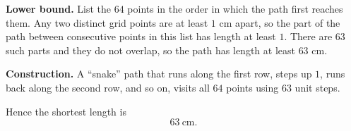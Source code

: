 \textbf{Lower bound.} List the $64$ points in the order in which the path first reaches them. Any two distinct grid points are at least $1$ cm apart, so the part of the path between consecutive points in this list has length at least $1$. There are $63$ such parts and they do not overlap, so the path has length at least $63$ cm.

\textbf{Construction.} A ``snake'' path that runs along the first row, steps up $1$, runs back along the second row, and so on, visits all $64$ points using $63$ unit steps.

Hence the shortest length is
\[\boxed{63}\ \text{cm}.\]
